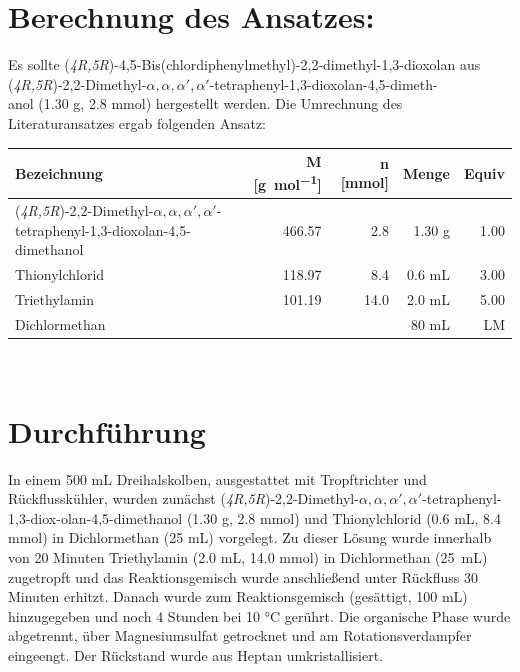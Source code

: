 \documentclass[12pt]{article}
\begin{document}
\begin{onehalfspace}

\section{Berechnung des Ansatzes: }
Es sollte (\textit{4R,5R})-4,5-Bis(chlordiphenylmethyl)-2,2-dimethyl-1,3-dioxolan aus (\textit{4R,5R})-2,2-Dimethyl-$\alpha ,\alpha ,\alpha ',\alpha '$-tetraphenyl-1,3-dioxolan-4,5-dimeth-\\anol (1.30 \si{\gram}, 2.8 mmol) hergestellt werden. Die Umrechnung des Literaturansatzes ergab folgenden Ansatz:\cite{vor}

\begin{table}
\begin{tabularx}{\textwidth}{Xrrrr}
\toprule
\textbf{ Bezeichnung }&\textbf{M [\si{\gram\per\mol}]} & \textbf{ n [\si{\milli\mol}]} & \textbf{Menge} & \textbf{Equiv}\\
\midrule
(\textit{4R,5R})-2,2-Dimethyl-$\alpha ,\alpha ,\alpha ',\alpha '$-tetraphenyl-1,3-dioxolan-4,5-dimethanol & 466.57 & 2.8  & 1.30 \si{\gram} & 1.00 \\
 Thionylchlorid  & 118.97   &  8.4  &  0.6 \si{\milli\liter} & 3.00 \\
 Triethylamin    & 101.19   &  14.0 &  2.0 \si{\milli\liter} & 5.00 \\
 Dichlormethan &   &  & 80 \si{\milli\liter}& LM \\
\bottomrule
\end{tabularx}\\
\end{table}

\section{Durchführung \cite{vor}}
In einem 500 \si{\milli\liter} Dreihalskolben, ausgestattet mit Tropftrichter und Rückflusskühler, wurden zunächst (\textit{4R,5R})-2,2-Dimethyl-$\alpha ,\alpha ,\alpha ',\alpha '$-tetraphenyl-1,3-diox-olan-4,5-dimethanol (1.30 \si{\gram}, 2.8 \si{\milli\mol}) und Thionylchlorid (0.6 \si{\milli\liter}, 8.4 \si{\milli\mol}) in Dichlormethan (25 \si{\milli\liter}) vorgelegt. Zu dieser Lösung wurde innerhalb von 20 Minuten Triethylamin (2.0 \si{\milli\liter}, 14.0 \si{\milli\mol}) in Dichlormethan (25~\si{\milli\liter}) zugetropft und das Reaktionsgemisch wurde anschließend unter Rückfluss 30 Minuten erhitzt. Danach wurde zum Reaktionsgemisch  (gesättigt, 100 \si{\milli\liter}) hinzugegeben und noch 4 Stunden bei 10 \si{\celsius} gerührt. Die organische Phase wurde abgetrennt, über Magnesiumsulfat getrocknet und am Rotationsverdampfer eingeengt. Der Rückstand wurde aus Heptan umkristallisiert.

\end{onehalfspace}
\end{document}
